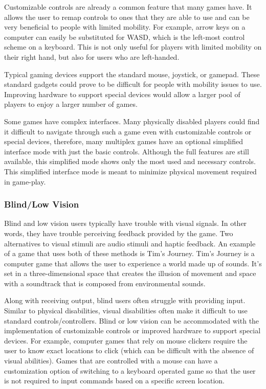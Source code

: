 \documentclass[10pt,twocolumn]{article}
\begin{document}
    Customizable controls are already a common feature that many games have. It allows the user to remap controls to ones that they are able to use and can be very beneficial to people with limited mobility. For example, arrow keys on a computer can easily be substituted for WASD, which is the left-most control scheme on a keyboard. This is not only useful for players with limited mobility on their right hand, but also for users who are left-handed. 

    Typical gaming devices support the standard mouse, joystick, or gamepad. These standard gadgets could prove to be difficult for people with mobility issues to use. Improving hardware to support special devices would allow a larger pool of players to enjoy a larger number of games. 

    Some games have complex interfaces. Many physically disabled players could find it difficult to navigate through such a game even with customizable controls or special devices, therefore, many multiplex games have an optional simplified interface mode with just the basic controls. Although the full features are still available, this simplified mode shows only the most used and necessary controls. This simplified interface mode is meant to minimize physical movement required in game-play.

\subsubsection{Blind/Low Vision}

    Blind and low vision users typically have trouble with visual signals. In other words, they have trouble perceiving feedback provided by the game. \cite{eskelinen2001gaming} Two alternatives to visual stimuli are audio stimuli and haptic feedback. An example of a game that uses both of these methods is Tim's Journey. Tim's Journey is a computer game that allows the user to experience a world made up of sounds. \cite{eskelinen2001gaming} It's set in a three-dimensional space that creates the illusion of movement and space with a soundtrack that is composed from environmental sounds. \cite{eskelinen2001gaming}
    
    Along with receiving output, blind users often struggle with providing input. Similar to physical disabilities, visual disabilities often make it difficult to use standard controls/controllers. Blind or low vision can be accommodated with the implementation of customizable controls or improved hardware to support special devices. For example, computer games that rely on mouse clickers require the user to know exact locations to click (which can be difficult with the absence of visual abilities). Games that are controlled with a mouse can have a customization option of switching to a keyboard operated game so that the user is not required to input commands based on a specific screen location.
\end{document}
